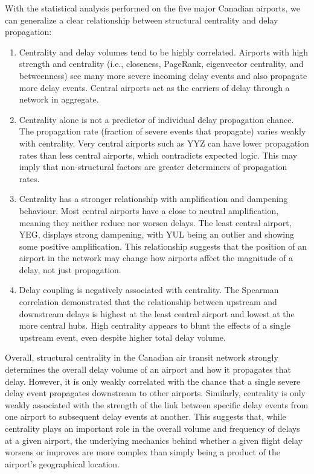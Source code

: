 \documentclass[9pt]{article}
\begin{document}
With the statistical analysis performed on the five major Canadian airports, we can generalize a clear relationship between structural centrality and delay propagation:

\begin{enumerate}
    \item Centrality and delay volumes tend to be highly correlated. Airports with high strength and centrality (i.e., closeness, PageRank, eigenvector centrality, and betweenness) see many more severe incoming delay events and also propagate more delay events. Central airports act as the carriers of delay through a network in aggregate.

    \item Centrality alone is not a predictor of individual delay propagation chance. The propagation rate (fraction of severe events that propagate) varies weakly with centrality. Very central airports such as YYZ can have lower propagation rates than less central airports, which contradicts expected logic. This may imply that non-structural factors are greater determiners of propagation rates.

    \item Centrality has a stronger relationship with amplification and dampening behaviour. Most central airports have a close to neutral amplification, meaning they neither reduce nor worsen delays. The least central airport, YEG, displays strong dampening, with YUL being an outlier and showing some positive amplification. This relationship suggests that the position of an airport in the network may change how airports affect the magnitude of a delay, not just propagation.

    \item Delay coupling is negatively associated with centrality. The Spearman correlation demonstrated that the relationship between upstream and downstream delays is highest at the least central airport and lowest at the more central hubs. High centrality appears to blunt the effects of a single upstream event, even despite higher total delay volume.
\end{enumerate}

Overall, structural centrality in the Canadian air transit network strongly determines the overall delay volume of an airport and how it propagates that delay. However, it is only weakly correlated with the chance that a single severe delay event propagates downstream to other airports. Similarly, centrality is only weakly associated with the strength of the link between specific delay events from one airport to subsequent delay events at another. This suggests that, while centrality plays an important role in the overall volume and frequency of delays at a given airport, the underlying mechanics behind whether a given flight delay worsens or improves are more complex than simply being a product of the airport's geographical location.
\end{document}
